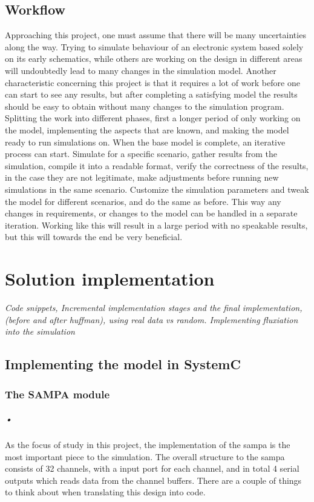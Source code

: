 \documentclass[a4paper, 12pt]{report}
\begin{document}
\section{Workflow}
Approaching this project, one must assume that there will be many uncertainties along the way.
Trying to simulate behaviour of an electronic system based solely on its early schematics, while others are working on the design in different areas will undoubtedly lead to many changes in the simulation model.
Another characteristic concerning this project is that it requires a lot of work before one can start to see any results, but after completing a satisfying  model the results should be easy to obtain without many changes to the simulation program.
Splitting the work into different phases, first a longer period of only working on the model, implementing the aspects that are known, and making the model ready to run simulations on.
When the base model is complete, an iterative process can start.
Simulate for a specific scenario, gather results from the simulation, compile it into a readable format, verify the correctness of the results, in the case they are not legitimate, make adjustments before running new simulations in the same scenario.
Customize the simulation parameters and tweak the model for different scenarios, and do the same as before.
This way any changes in requirements, or changes to the model can be handled in a separate iteration.
Working like this will result in a large period with no speakable results, but this will towards the end be very beneficial.

\chapter{Solution implementation}
\textit{Code snippets, Incremental implementation stages and the final implementation, (before and after huffman), using real data vs random. Implementing fluxiation into the simulation}
\section{Implementing the model in SystemC}

\subsection{The SAMPA module}

\paragraph{•}
As the focus of study in this project, the implementation of the \gls{sampa} is the most important piece to the simulation.
The overall structure to the \gls{sampa} consists of 32 channels, with a input port for each channel, and in total 4 serial outputs which reads data from the channel buffers.
There are a couple of things to think about when translating this design into code.
\end{document}

